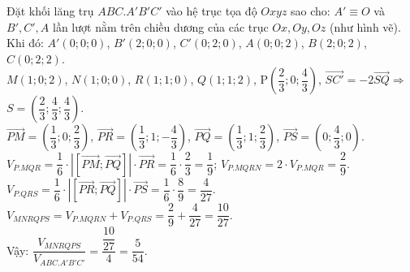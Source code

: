 \begin{ex}
{		Đặt khối lăng trụ $ABC.A'B'C'$ vào hệ trục tọa độ $Oxyz$ sao cho: $A'\equiv O$ và $B',C',A$ lần lượt nằm trên chiều dương của các trục $Ox,Oy,Oz$ (như hình vẽ).\\
		Khi đó: $A'(0;0;0)$, $B'(2;0;0)$, $C'(0;2;0)$, $A(0;0;2)$, $B(2;0;2)$, $C(0;2;2)$.\\
		$M(1;0;2)$, $N(1;0;0)$, $R(1;1;0)$, $Q(1;1;2)$, $\mathrm{P}\left(\dfrac{2}{3};0;\dfrac{4}{3}\right)$, $\overrightarrow{SC'}=-2\overrightarrow{SQ}\Rightarrow$  $S=\left(\dfrac{2}{3};\dfrac{4}{3};\dfrac{4}{3}\right)$.\\
		$\overrightarrow{PM}=\left(\dfrac{1}{3};0;\dfrac{2}{3}\right)$, $\overrightarrow{PR}=\left(\dfrac{1}{3};1;-\dfrac{4}{3}\right)$, $\overrightarrow{PQ}=\left(\dfrac{1}{3};1;\dfrac{2}{3}\right)$, $\overrightarrow{PS}=\left(0;\dfrac{4}{3};0\right)$.\\
		$V_{P.MQR}=\dfrac{1}{6}\cdot\left|\left[\overrightarrow{PM};\overrightarrow{PQ}\right]\right|\cdot\overrightarrow{PR}=\dfrac{1}{6}\cdot\dfrac{2}{3}=\dfrac{1}{9}$; $V_{P.MQRN}=2\cdot V_{P.MQR}=\dfrac{2}{9}$.\\
		$V_{P.QRS}=\dfrac{1}{6}\cdot\left|\left[\overrightarrow{PR};\overrightarrow{PQ}\right]\right|\cdot\overrightarrow{PS}=\dfrac{1}{6}\cdot\dfrac{8}{9}=\dfrac{4}{27}$.\\
		$V_{MNRQPS}=V_{P.MQRN}+V_{P.QRS}=\dfrac{2}{9}+\dfrac{4}{27}=\dfrac{10}{27}$.\\
		Vậy: $\dfrac{V_{MNRQPS}}{V_{ABC.A'B'C'}}=\dfrac{\dfrac{10}{27}}{4}=\dfrac{5}{54}$.}
\end{ex}

